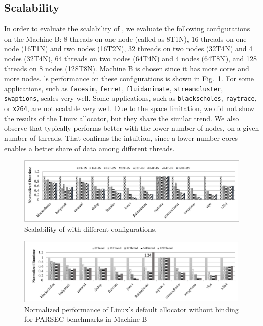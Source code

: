 
\subsection{Scalability}
\label{sec:scale}

In order to evaluate the scalability of \NM{}, we evaluate the following configurations on the Machine B: 8 threads on one node (called as 8T1N), 16 threads on one node (16T1N) and two nodes (16T2N), 32 threads on two nodes (32T4N) and 4 nodes (32T4N), 64 threads on two nodes (64T4N) and 4 nodes (64T8N), and 128 threads on 8 nodes (128T8N). Machine B is chosen since it has more cores and more nodes. \NM{}'s performance on these configurations is shown in Fig.~\ref{fig: numalloc-scalability}. For some applications, such as \texttt{facesim}, \texttt{ferret}, \texttt{fluidanimate}, \texttt{streamcluster}, \texttt{swaptions}, \NM{} scales very well. Some applications, such as \texttt{blackscholes}, \texttt{raytrace}, or \texttt{x264}, are not scalable very well. Due to the space limitation, we did not show the results of the Linux allocator, but they share the similar trend. We also observe that \NM{} typically performs better with the lower number of nodes, on a given number of threads.  That confirms the intuition, since a lower number cores enables a better share of data among different threads. 

\begin{figure}[H]
    \centering
    \includegraphics[width=\textwidth]{figure/scalobility-numalloc.pdf}
    \caption{Scalability of \NM{} with different configurations.\label{fig: numalloc-scalability}}
\end{figure}

\begin{figure}[!h]
    \centering
    \includegraphics[width=\textwidth]{figure/scalability-pthread.pdf}
    \caption{Normalized performance of Linux's default allocator without binding for PARSEC benchmarks in Machine B}
    \label{pthread-scalibity}
\end{figure}

